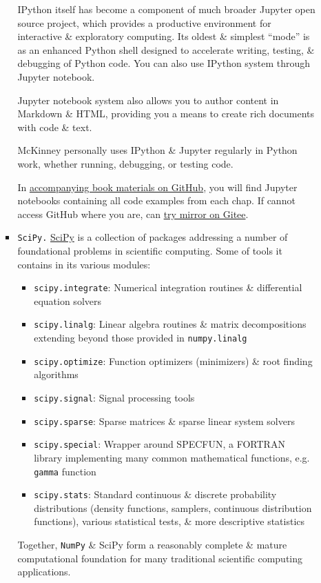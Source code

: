 \documentclass{article}
\begin{document}
\begin{itemize}
\begin{itemize}
\begin{itemize}
			IPython itself has become a component of much broader Jupyter open source project, which provides a productive environment for interactive \& exploratory computing. Its oldest \& simplest ``mode'' is as an enhanced Python shell designed to accelerate writing, testing, \& debugging of Python code. You can also use IPython system through Jupyter notebook.
			
			Jupyter notebook system also allows you to author content in Markdown \& HTML, providing you a means to create rich documents with code \& text.
			
			{\sc McKinney} personally uses IPython \& Jupyter regularly in Python work, whether running, debugging, or testing code.
			
			In \href{https://github.com/wesm/pydata-book}{accompanying book materials on GitHub}, you will find Jupyter notebooks containing all code examples from each chap. If cannot access GitHub where you are, can \href{https://gitee.com/wesmckinn/pydata-book}{try mirror on Gitee}.
			\item {\tt SciPy.} \href{https://scipy.org}{SciPy} is a collection of packages addressing a number of foundational problems in scientific computing. Some of tools it contains in its various modules:
			\begin{itemize}
				\item {\tt scipy.integrate}: Numerical integration routines \& differential equation solvers
				\item {\tt scipy.linalg}: Linear algebra routines \& matrix decompositions extending beyond those provided in {\tt numpy.linalg}
				\item {\tt scipy.optimize}: Function optimizers (minimizers) \& root finding algorithms
				\item {\tt scipy.signal}: Signal processing tools
				\item {\tt scipy.sparse}: Sparse matrices \& sparse linear system solvers
				\item {\tt scipy.special}: Wrapper around SPECFUN, a FORTRAN library implementing many common mathematical functions, e.g. {\tt gamma} function
				\item {\tt scipy.stats}: Standard continuous \& discrete probability distributions (density functions, samplers, continuous distribution functions), various statistical tests, \& more descriptive statistics
			\end{itemize}
			Together, {\tt NumPy} \& SciPy form a reasonably complete \& mature computational foundation for many traditional scientific computing applications.

\end{itemize}
\end{itemize}
\end{itemize}
\end{document}
